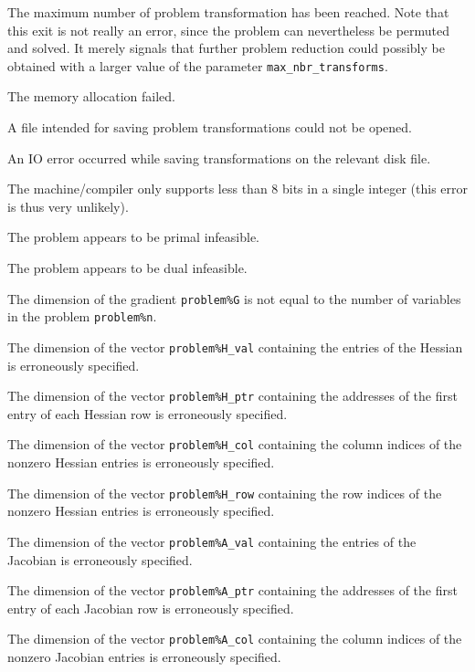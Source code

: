 \documentclass{galahad}
\begin{document}
\begin{description}

 The maximum number of problem transformation has been reached.
Note that this exit is not really an error, since the problem
can  nevertheless be permuted and  solved.  It merely
signals that further problem reduction could possibly
be obtained with a larger value of the parameter
{\tt max\_nbr\_transforms}.

 The memory allocation failed.

 A file intended for saving problem transformations could not be
opened.

 An IO error occurred while saving transformations on 
the relevant disk file.

 The machine/compiler only supports less than 8 bits in a
single integer (this error is thus very unlikely).

 The problem appears to be primal infeasible.

 The problem appears to be dual infeasible.

 The dimension of the gradient {\tt problem\%G} is not equal to
the number of variables in the problem {\tt problem\%n}.

 The dimension of the vector {\tt problem\%H\_val} containing the
entries of the Hessian is erroneously specified.

 The dimension of the vector {\tt problem\%H\_ptr} containing the
addresses of the first entry of each Hessian row is erroneously specified.

 The dimension of the vector {\tt problem\%H\_col} containing the
column  indices of the nonzero Hessian entries is erroneously specified.

 The dimension of the vector {\tt problem\%H\_row} containing the
row indices of the nonzero Hessian entries is erroneously specified.

 The dimension of the vector {\tt problem\%A\_val} containing the
entries of the Jacobian is erroneously specified.

 The dimension of the vector {\tt problem\%A\_ptr} containing the
addresses of the first entry of each Jacobian row is erroneously specified.

 The dimension of the vector {\tt problem\%A\_col} containing 
the column indices of the nonzero Jacobian entries is erroneously specified.


\end{description}
\end{document}
